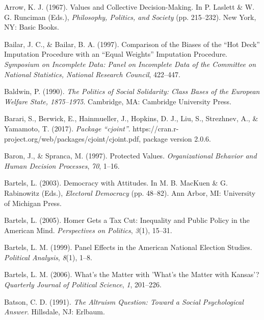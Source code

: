 \documentclass[12pt,econ]{sources/authesis}
\begin{document}
\leavevmode\hypertarget{ref-arrow_1967_values}{}%
Arrow, K. J. (1967). Values and Collective Decision-Making. In P. Laslett \& W. G. Runciman (Eds.), \emph{Philosophy, Politics, and Society} (pp. 215--232). New York, NY: Basic Books.

\leavevmode\hypertarget{ref-bailar_1997_comparison}{}%
Bailar, J. C., \& Bailar, B. A. (1997). Comparison of the Biases of the ``Hot Deck'' Imputation Procedure with an ``Equal Weights'' Imputation Procedure. \emph{Symposium on Incomplete Data: Panel on Incomplete Data of the Committee on National Statistics, National Research Council}, 422--447.

\leavevmode\hypertarget{ref-baldwin_1990_politics}{}%
Baldwin, P. (1990). \emph{The Politics of Social Solidarity: Class Bases of the European Welfare State, 1875--1975}. Cambridge, MA: Cambridge University Press.

\leavevmode\hypertarget{ref-barari_2017_package}{}%
Barari, S., Berwick, E., Hainmueller, J., Hopkins, D. J., Liu, S., Strezhnev, A., \& Yamamoto, T. (2017). \emph{Package ``cjoint''}. https://cran.r-project.org/web/packages/cjoint/cjoint.pdf, package version 2.0.6.

\leavevmode\hypertarget{ref-baron_protected_1997}{}%
Baron, J., \& Spranca, M. (1997). Protected Values. \emph{Organizational Behavior and Human Decision Processes}, \emph{70}, 1--16.

\leavevmode\hypertarget{ref-bartels_2003_democracy}{}%
Bartels, L. (2003). Democracy with Attitudes. In M. B. MacKuen \& G. Rabinowitz (Eds.), \emph{Electoral Democracy} (pp. 48--82). Ann Arbor, MI: University of Michigan Press.

\leavevmode\hypertarget{ref-bartels_2005_homer}{}%
Bartels, L. (2005). Homer Gets a Tax Cut: Inequality and Public Policy in the American Mind. \emph{Perspectives on Politics}, \emph{3}(1), 15--31.

\leavevmode\hypertarget{ref-bartels_1999_panel}{}%
Bartels, L. M. (1999). Panel Effects in the American National Election Studies. \emph{Political Analysis}, \emph{8}(1), 1--8.

\leavevmode\hypertarget{ref-bartels_2006_whats}{}%
Bartels, L. M. (2006). What's the Matter with 'What's the Matter with Kansas'? \emph{Quarterly Journal of Political Science}, \emph{1}, 201--226.

\leavevmode\hypertarget{ref-batson_altruism_1991}{}%
Batson, C. D. (1991). \emph{The Altruism Question: Toward a Social Psychological Answer}. Hillsdale, NJ: Erlbaum.
\end{document}
